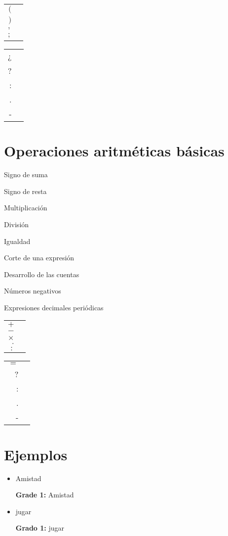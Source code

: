 \documentclass[draft]{article}
\newcommand{\mytable}[1]{%
    \enskip\begin{tabular}[t]{r|l} 
    \hline #1 \hline
    \end{tabular}\enskip}
\begin{document}
\begin{center}
	\mytable{
		$($&\braille{{gh}} \\
		$)$&\braille{{ar}} \\
		$,$&\braille{,}    \\
		$;$&\braille{;}    \\
	}
	\mytable{
		¿&\braille{{``}} \\
		?&\braille{?} \\
		:&\braille{:}    \\
		.&\braille{'}    \\
		-&\braille{-} \\
	}
\end{center}


\section{Operaciones aritméticas básicas}

Signo de suma

Signo de resta

Multiplicación

División

Igualdad

Corte de una expresión

Desarrollo de las cuentas

Números negativos

Expresiones decimales periódicas

\begin{center}
	\mytable{
		$+$&\braille{!} \\
		$-$&\braille{-} \\
		$\times$&\braille{{``}}    \\
		$.$&\braille{'}    \\
		$:$&\braille{.}    \\
	}
	\mytable{
		$=$&\braille{=} \\
		?&\braille{?} \\
		:&\braille{:}    \\
		.&\braille{'}    \\
		-&\braille{-} \\
	}
\end{center}


\section{Ejemplos}

\sloppy
\begin{itemize}
	\item Amistad 
	
	{\bf Grade 1:} Amistad \\
	

	
\end{itemize}

\begin{itemize}
	\item jugar
	
	{\bf Grado 1:} jugar \\
	
	
	
\end{itemize}
\end{document}
